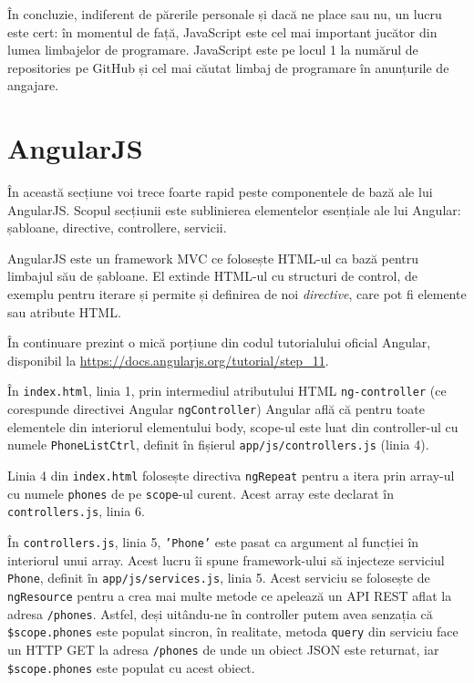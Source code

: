 În concluzie, indiferent de părerile personale și dacă ne place
sau nu, un lucru este cert: în momentul de față, JavaScript
este cel mai important jucător din lumea limbajelor
de programare. JavaScript este pe locul 1 la numărul de
repositories pe GitHub și cel mai căutat limbaj de programare
în anunțurile de angajare.

\section{AngularJS}

În această secțiune voi trece foarte rapid peste componentele
de bază ale lui AngularJS. Scopul secțiunii 
este sublinierea elementelor
esențiale ale lui Angular: șabloane, directive, controllere,
servicii.


AngularJS este un framework MVC ce folosește HTML-ul ca bază pentru
limbajul său de șabloane. El extinde HTML-ul cu structuri de control,
de exemplu pentru iterare și permite și definirea de noi \emph{directive},
care pot fi elemente sau atribute HTML.

În continuare prezint o mică porțiune din codul tutorialului oficial Angular, disponibil la 
\url{https://docs.angularjs.org/tutorial/step_11}.





În \texttt{index.html}, linia 1, prin intermediul atributului HTML \texttt{ng-controller}
(ce corespunde directivei Angular \texttt{ngController}) Angular
află că pentru toate elementele din interiorul elementului
body, scope-ul este luat din controller-ul cu numele
\texttt{PhoneListCtrl}, definit în fișierul 
\texttt{app/js/controllers.js} (linia 4).

Linia 4 din \texttt{index.html} folosește directiva \texttt{ngRepeat} pentru
a itera prin array-ul cu numele \texttt{phones} de pe \texttt{scope}-ul curent.
Acest array este declarat în \texttt{controllers.js}, linia 6.

În \texttt{controllers.js}, linia 5, \texttt{'Phone'} este pasat
ca argument al funcției în interiorul unui array. Acest lucru
îi spune framework-ului să injecteze serviciul \texttt{Phone},
definit în \texttt{app/js/services.js}, linia 5.
Acest serviciu se folosește de \texttt{ngResource} pentru a
crea mai multe metode ce apelează un API REST aflat la adresa
\texttt{/phones}. Astfel, deși uitându-ne în controller putem
avea senzația că \texttt{\$scope.phones} este populat sincron,
în realitate, metoda \texttt{query} din serviciu face un HTTP GET
la adresa \texttt{/phones} de unde un obiect JSON este returnat,
iar \texttt{\$scope.phones} este populat cu acest obiect.

